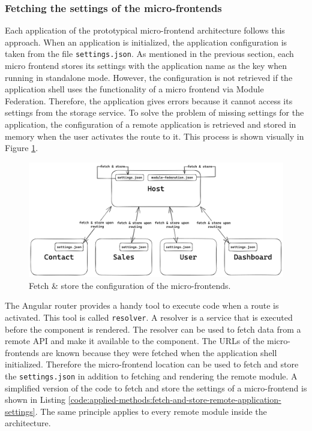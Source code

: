 \subsubsection{Fetching the settings of the micro-frontends}\label{subsubsection:applied-methods:prototypical-implementation
:load-the-configuration}

Each application of the prototypical micro-frontend architecture follows this approach. When an application is initialized, the application configuration is taken from the file \texttt{settings.json}. As mentioned in the previous section, each micro frontend stores its settings with the application name as the key when running in standalone mode. However, the configuration is not retrieved if the application shell uses the functionality of a micro frontend via Module Federation. Therefore, the application gives errors because it cannot access its settings from the storage service. To solve the problem of missing settings for the application, the configuration of a remote application is retrieved and stored in memory when the user activates the route to it. This process is shown visually in Figure \ref{fig:applied-methods:load-remote-settings}.

\ifshowImages
  \begin{figure}[H]
  \centering
  \includegraphics[width=1\linewidth]{images/applied-methods/prototypical-implementation/load-remote-settings.png}
  \caption{Fetch \& store the configuration of the micro-frontends.}\label{fig:applied-methods:load-remote-settings}
  \end{figure}
\fi

\noindent The Angular router provides a handy tool to execute code when a route is activated. This tool is called \texttt{resolver}. A resolver is a service that is executed before the component is rendered. The resolver can be used to fetch data from a remote \ac{API} and make it available to the component. \cite{misc:-:applied-methods:micro-frontends:angular-router-resolver} The \acp{URL} of the micro-frontends are known because they were fetched when the application shell initialized. Therefore the micro-frontend location can be used to fetch and store the \texttt{settings.json} in addition to fetching and rendering the remote module. A simplified version of the code to fetch and store the settings of a micro-frontend is shown in Listing \ref{code:applied-methods:fetch-and-store-remote-application-settings}. The same principle applies to every remote module inside the architecture.

